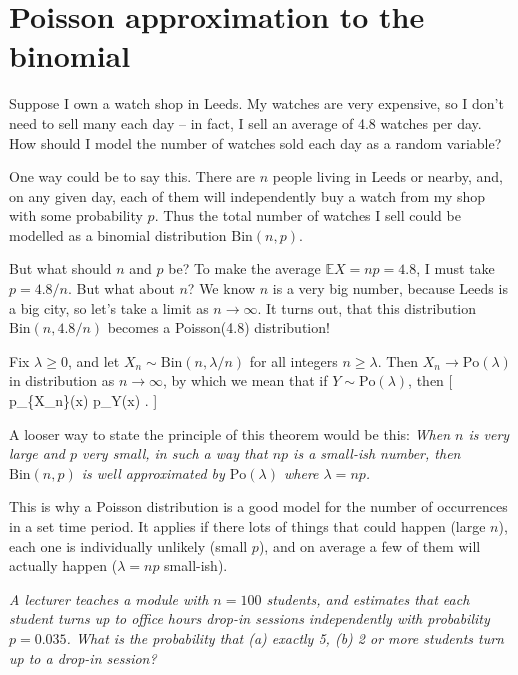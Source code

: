 \documentclass[
  letterpaper,
  DIV=11,
  numbers=noendperiod]{scrreprt}
\theoremstyle{remark}
\begin{document}
\hypertarget{poisson-approx}{%
\section{Poisson approximation to the binomial}\label{poisson-approx}}

Suppose I own a watch shop in Leeds. My watches are very expensive, so I
don't need to sell many each day -- in fact, I sell an average of 4.8
watches per day. How should I model the number of watches sold each day
as a random variable?

One way could be to say this. There are \(n\) people living in Leeds or
nearby, and, on any given day, each of them will independently buy a
watch from my shop with some probability \(p\). Thus the total number of
watches I sell could be modelled as a binomial distribution
\(\text{Bin}(n, p)\).

But what should \(n\) and \(p\) be? To make the average
\(\mathbb EX = np = 4.8\), I must take \(p = 4.8/n\). But what about
\(n\)? We know \(n\) is a very big number, because Leeds is a big city,
so let's take a limit as \(n \to \infty\). It turns out, that this
distribution \(\text{Bin}(n, 4.8/n)\) becomes a Poisson(4.8)
distribution!

\leavevmode{}%
Fix \(\lambda \geq 0\), and let \(X_n \sim \text{Bin}(n, \lambda/n)\)
for all integers \(n \geq \lambda\). Then \(X_n \to \text{Po}(\lambda)\)
in distribution as \(n \to \infty\), by which we mean that if
\(Y \sim \text{Po}(\lambda)\), then {[} p\_\{X\_n\}(x) \to p\_Y(x)
\qquad {}. {]}

A looser way to state the principle of this theorem would be this:
\emph{When \(n\) is very large and \(p\) very small, in such a way that
\(np\) is a small-ish number, then \(\text{Bin}(n,p)\) is well
approximated by \(\text{Po}(\lambda)\) where \(\lambda = np\).}

This is why a Poisson distribution is a good model for the number of
occurrences in a set time period. It applies if there lots of things
that could happen (large \(n\)), each one is individually unlikely
(small \(p\)), and on average a few of them will actually happen
(\(\lambda = np\) small-ish).

\emph{A lecturer teaches a module with \(n = 100\) students, and
estimates that each student turns up to office hours drop-in sessions
independently with probability \(p = 0.035\). What is the probability
that (a) exactly 5, (b) 2 or more students turn up to a drop-in
session?}
\end{document}
